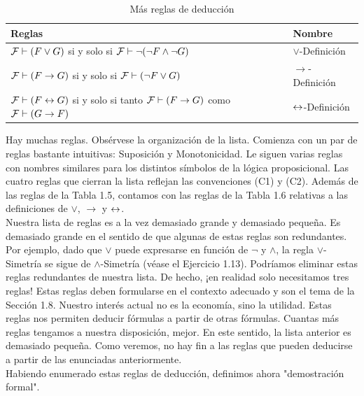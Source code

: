\message{ !name(main.tex)}\documentclass[12pt,a4paper]{book}
\newcommand{\comillas}[1]{"#1"}
\begin{document}
    \vspace{0.5cm}

    \begin{table}[htbp]
        \centering
        \small
        \caption{Más reglas de deducción}
        \renewcommand{\arraystretch}{1.5}
        \setlength{\tabcolsep}{8pt}
        \begin{tabular}{l l}
            Reglas & Nombre\\
            \hline
            $\mathcal{F}\vdash(F\vee G)$ si y solo si $\mathcal{F}\vdash\neg(\neg F\wedge\neg G)$ & $\vee$-Definición\\
            $\mathcal{F}\vdash(F\rightarrow G)$ si y solo si $\mathcal{F}\vdash(\neg F\vee G)$ & $\rightarrow$-Definición\\
            $\mathcal{F}\vdash(F\leftrightarrow G)$ si y solo si tanto $\mathcal{F}\vdash(F\rightarrow G)$ como $\mathcal{F}\vdash(G\rightarrow F)$ & $\leftrightarrow$-Definición\\
        \end{tabular}
    \end{table}

    \vspace{0.5cm}

    Hay muchas reglas. Obsérvese la organización de la lista. Comienza con un par de reglas bastante intuitivas: Suposición y
    Monotonicidad. Le siguen varias reglas con nombres similares para los distintos símbolos de la lógica proposicional. Las
    cuatro reglas que cierran la lista reflejan las convenciones (C1) y (C2). Además de las reglas de la Tabla 1.5, contamos con
    las reglas de la Tabla 1.6 relativas a las definiciones de $\vee$, $\rightarrow$ y $\leftrightarrow$.\\
    Nuestra lista de reglas es a la vez demasiado grande y demasiado pequeña. Es demasiado grande en el sentido de que algunas
    de estas reglas son redundantes. Por ejemplo, dado que $\vee$ puede expresarse en función de $\neg$ y $\wedge$, la regla
    $\vee$-Simetría se sigue de $\wedge$-Simetría (véase el Ejercicio 1.13). Podríamos eliminar estas reglas redundantes de
    nuestra lista. De hecho, ¡en realidad solo necesitamos tres reglas! Estas reglas deben formularse en el contexto adecuado y
    son el tema de la Sección 1.8. Nuestro interés actual no es la economía, sino la utilidad. Estas reglas nos permiten deducir
    fórmulas a partir de otras fórmulas. Cuantas más reglas tengamos a nuestra disposición, mejor. En este sentido, la lista
    anterior es demasiado pequeña. Como veremos, no hay fin a las reglas que pueden deducirse a partir de las enunciadas
    anteriormente.\\
    Habiendo enumerado estas reglas de deducción, definimos ahora \comillas{demostración formal}.
\end{document}
